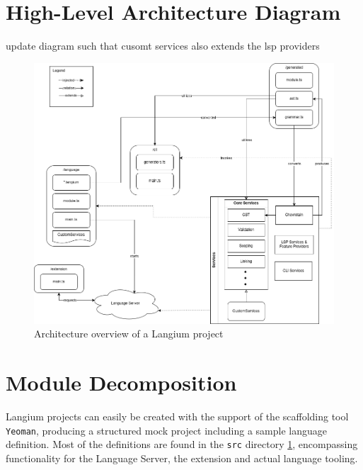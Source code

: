 \section{High-Level Architecture Diagram}
update diagram such that cusomt services also extends the lsp providers
\begin{figure}
  \centering
  \includegraphics[width=\textwidth]{graphics/langiumArchitecture.png}
  \caption{Architecture overview of a Langium project}
  \label{fig:langium-architecture}
\end{figure}


\section{Module Decomposition}

Langium projects can easily be created with the support of the scaffolding tool \verb|Yeoman|, producing a structured mock project including a sample language definition.
Most of the definitions are found in the \verb|src| directory \ref{fig:langium-architecture}, encompassing functionality for the Language Server, the extension and actual language tooling.

